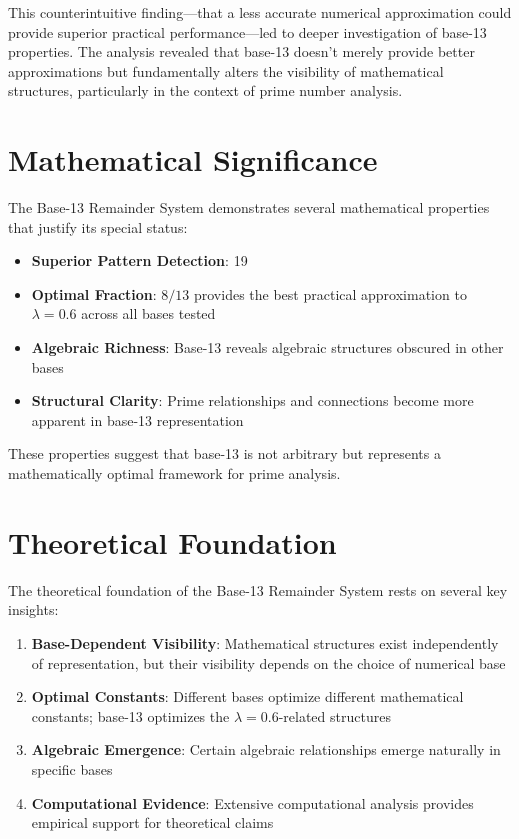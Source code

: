\documentclass[12pt,a4paper]{report}
\newcommand{\lambdaval}{\lambda = 0.6}
\begin{document}
This counterintuitive finding—that a less accurate numerical approximation could provide superior practical performance—led to deeper investigation of base-13 properties. The analysis revealed that base-13 doesn't merely provide better approximations but fundamentally alters the visibility of mathematical structures, particularly in the context of prime number analysis.

\section{Mathematical Significance}

The Base-13 Remainder System demonstrates several mathematical properties that justify its special status:

\begin{itemize}
\item \textbf{Superior Pattern Detection}: 19%
\item \textbf{Optimal Fraction}: $8/13$ provides the best practical approximation to $\lambdaval$ across all bases tested
\item \textbf{Algebraic Richness}: Base-13 reveals algebraic structures obscured in other bases
\item \textbf{Structural Clarity}: Prime relationships and connections become more apparent in base-13 representation
\end{itemize}

These properties suggest that base-13 is not arbitrary but represents a mathematically optimal framework for prime analysis.

\section{Theoretical Foundation}

The theoretical foundation of the Base-13 Remainder System rests on several key insights:

\begin{enumerate}
\item \textbf{Base-Dependent Visibility}: Mathematical structures exist independently of representation, but their visibility depends on the choice of numerical base
\item \textbf{Optimal Constants}: Different bases optimize different mathematical constants; base-13 optimizes the $\lambdaval$-related structures
\item \textbf{Algebraic Emergence}: Certain algebraic relationships emerge naturally in specific bases
\item \textbf{Computational Evidence}: Extensive computational analysis provides empirical support for theoretical claims
\end{enumerate}
\end{document}
